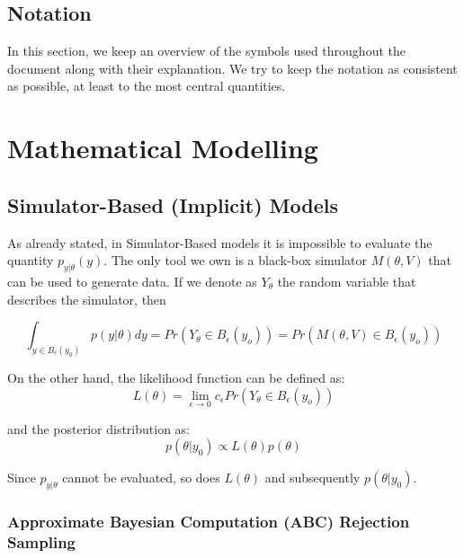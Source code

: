 \documentclass[11pt,twoside]{article}
\numberwithin{Theorem}{section}
\numberwithin{Definition}{section}
\numberwithin{Lemma}{section}
\numberwithin{Algorithm}{section}
\numberwithin{equation}{section}
\begin{document}
\subsection{Notation}

In this section, we keep an overview of the symbols used throughout the document along with their explanation. We try to keep the notation as consistent as possible, at least to the most central quantities.

\clearpage

\section{Mathematical Modelling}
\label{sec:background}

\clearpage

\subsection{Simulator-Based (Implicit) Models}

As already stated, in Simulator-Based models it is impossible to evaluate the quantity $p_{y|\theta}(y)$. The only tool we own is a black-box simulator $M(\theta, V)$ that can be used to generate data. If we denote as $Y_\theta$ the random variable that describes the simulator, then

\begin{equation}
  \int_{y \in B_\epsilon(y_0)} p(y|\theta)dy =  Pr(Y_\theta \in B_\epsilon(y_o)) = Pr(M(\theta, V) \in B_\epsilon(y_o))
  \end{equation}

  On the other hand, the likelihood function can be defined as:
\begin{equation}
  L(\theta) =  \lim_{\epsilon \to 0} c_\epsilon Pr(Y_\theta \in B_\epsilon(y_o))
\end{equation}

and the posterior distribution as:
\begin{equation}
p(\theta|y_0) \propto L(\theta)p(\theta)
\end{equation}

Since $p_{y|\theta}$ cannot be evaluated, so does $L(\theta)$ and subsequently $p(\theta|y_0)$.

\subsubsection{Approximate Bayesian Computation (ABC) Rejection Sampling}
\end{document}
